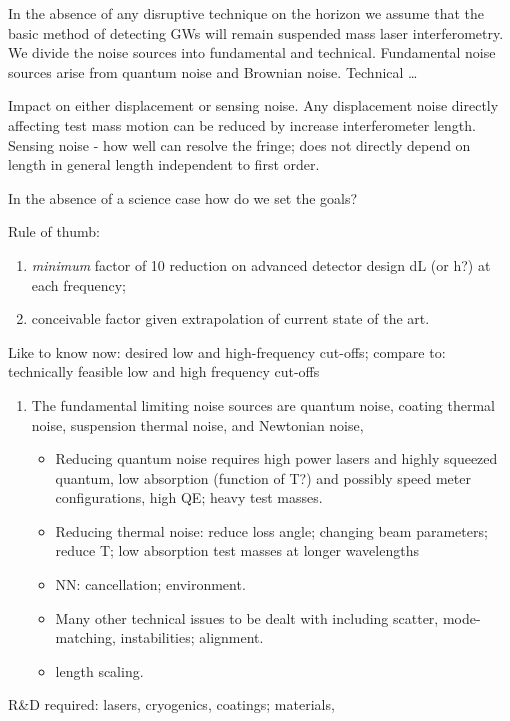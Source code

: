 In the absence of any disruptive technique on the horizon we assume that the basic method of detecting GWs will remain suspended mass laser interferometry.  We divide the noise sources into fundamental and technical.    Fundamental noise sources arise from quantum  noise and Brownian noise.  Technical {\dots}

Impact on either displacement or sensing noise.  Any displacement noise directly affecting test mass motion can be reduced by increase interferometer length. Sensing noise  - how well can resolve the fringe; does not directly depend on length in general length independent to first order.

In the absence of a science case how do we set the goals?

Rule of thumb:  

\begin{enumerate}
\item  \textit{ minimum} factor of 10 reduction on advanced detector design dL (or h?) at each frequency;  

\item  conceivable factor given extrapolation of current state of the art.
\end{enumerate}

Like to know now:  desired low and high-frequency cut-offs; compare to: technically feasible low and high frequency cut-offs

\begin{enumerate}
\item  The fundamental limiting noise sources are quantum noise, coating thermal noise, suspension thermal noise, and Newtonian noise,
\begin{itemize}
\item Reducing quantum noise requires high power lasers and highly squeezed quantum, low absorption (function of T?) and possibly speed meter configurations, high QE; heavy test masses.
\item  Reducing thermal noise:  reduce loss angle; changing beam parameters; reduce T;  low absorption test masses at longer wavelengths
\item NN:  cancellation; environment.
\item  Many other technical issues to be dealt with including scatter, mode-matching, instabilities; alignment.
\item length scaling.
\end{itemize}
\end{enumerate}

 R\&D required:  lasers, cryogenics, coatings; materials, \\
 
